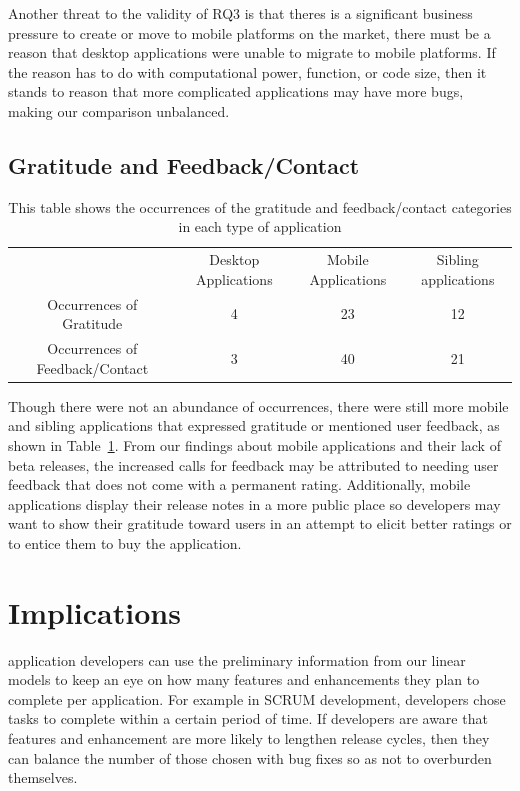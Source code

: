 \documentclass{acm_proc_article-sp}
\begin{document}
Another threat to the validity of RQ3 is that theres is a significant business pressure to create \sibs or move to mobile platforms on the market, there must be a reason that desktop applications were unable to migrate to mobile platforms. 
If the reason has to do with computational power, function, or code size, then it stands to reason that more complicated applications may have more bugs, making our comparison unbalanced.


\subsection{Gratitude and Feedback/Contact}

\begin{table}[width=.5\textwidth]
\begin{tabular}{c c c c}
 & Desktop Applications & Mobile Applications & Sibling applications \\
Occurrences of Gratitude & 4 & 23 & 12 \\
Occurrences of Feedback/Contact & 3 & 40 & 21 \\
\end{tabular}
\label{tab:gratandfeed}
\caption{This table shows the occurrences of the gratitude and feedback/contact categories in each type of application}
\end{table}

Though there were not an abundance of occurrences, there were still more mobile and sibling applications that expressed gratitude or mentioned user feedback, as shown in Table~\ref{tab:gratandfeed}.
From our findings about mobile applications and their lack of beta releases, the increased calls for feedback may be attributed to needing user feedback that does not come with a permanent rating.
Additionally, mobile applications display their release notes in a more public place so developers may want to show their gratitude toward users in an attempt to elicit better ratings or to entice them to buy the application.

\section{Implications}

 application developers can use the preliminary information from our linear models to keep an eye on how many features and enhancements they plan to complete per application. For example in SCRUM development, developers chose tasks to complete within a certain period of time.
If developers are aware that features and enhancement are more likely to lengthen release cycles, then they can balance the number of those chosen with bug fixes so as not to overburden themselves.
\end{document}
